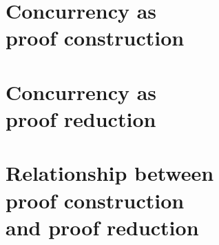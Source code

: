 \documentclass[
  tufte-book,
  notoc,
  symmetric,
  biblatex={
    citestyle=authoryear-comp,
    autocite=footnote,
    maxcitenames=2,
    bibstyle=authoryear,
    dashed=false,
    mergedate=basic,
    maxbibnames=99,
    backref=true,
    doi=false,
    url=false,
    isbn=false,
  }
]{tufte-thesis}
\begin{document}
 \part[Concurrency as proof construction]{Concurrency as\\proof construction}\label{part:proof-construction}



% 

% 


\part[Concurrency as proof reduction]{Concurrency as\\proof reduction}\label{part:proof-reduction}




\part[Relationship between proof construction and reduction]{Relationship between\\proof construction\\and proof reduction}\label{part:comparison}




\appendix




\backmatter

\printbibliography
\end{document}

